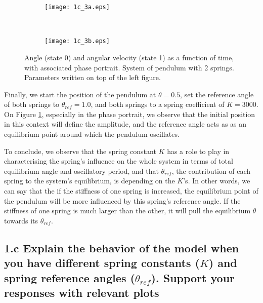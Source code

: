 \documentclass{cmc}
\begin{document}
\begin{figure}[H]
    \centering
    \begin{subfigure}[b]{0.5\textwidth}
        \centering
        \texttt{[image: 1c\_3a.eps]}
    \end{subfigure}%
    ~
    \begin{subfigure}[b]{0.5\textwidth}
        \centering
        \texttt{[image: 1c\_3b.eps]}
    \end{subfigure}
    \caption{Angle (state 0) and angular velocity (state 1) as a function of time, with associated phase portrait. System of pendulum with 2 springs. Parameters written on top of the left figure.}
    \label{figure:1c3}
\end{figure}

Finally, we start the position of the pendulum at $\theta=0.5$, set the reference angle of both springs to $\theta_{ref}=1.0$, and both springs to a spring coefficient of $K=3000$. On Figure \ref{figure:1c3}, especially in the phase portrait, we observe that the initial position in this context will define the amplitude, and the reference angle acts as as an equilibrium point around which the pendulum oscillates.

To conclude, we observe that the spring constant $K$ has a role to play in characterising the spring's influence on the whole system in terms of total equilibrium angle and oscillatory period, and that $\theta_{ref}$, the contribution of each spring to the system's equilibrium, is depending on the $K$'s. In other words, we can say that the if the stiffness of one spring is increased, the equilibrium point of the pendulum will be more influenced by this spring's reference angle. If the stiffness of one spring is much larger than the other, it will pull the equilibrium $\theta$ towards its $\theta_{ref}$.

\subsection*{1.c Explain the behavior of the model when you have
  different spring constants ($K$) and spring reference angles
  ($\theta_{ref}$). Support your responses with relevant plots}
\end{document}
